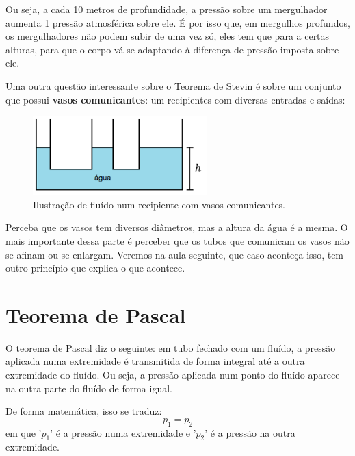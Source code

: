 \documentclass[12pt]{extarticle}
\newcommand{\<}{\langle}
\renewcommand{\>}{\rangle}
\theoremstyle{definition}
\begin{document}
Ou seja, a cada 10 metros de profundidade, a pressão sobre um mergulhador aumenta 1 pressão atmosférica sobre ele. É por isso que, em mergulhos profundos, os mergulhadores não podem subir de uma vez só, eles tem que para a certas alturas, para que o corpo vá se adaptando à diferença de pressão imposta sobre ele.

Uma outra questão interessante sobre o Teorema de Stevin é sobre um conjunto que possui \textbf{vasos comunicantes}: um recipientes com diversas entradas e saídas:
\begin{figure}[H]
    \centering
    \includegraphics[width=0.6\textwidth]{vasos_comunicantes.png}
    \caption{Ilustração de fluído num recipiente com vasos comunicantes.}
    \label{fig:vasos}
\end{figure}

Perceba que os vasos tem diversos diâmetros, mas a altura da água é a mesma. O mais importante dessa parte é perceber que os tubos que comunicam os vasos não se afinam ou se enlargam. Veremos na aula seguinte, que caso aconteça isso, tem outro princípio que explica o que acontece.

\section{Teorema de Pascal}
O teorema de Pascal diz o seguinte: em tubo fechado com um fluído, a pressão aplicada numa extremidade é transmitida de forma integral até a outra extremidade do fluído. Ou seja, a pressão aplicada num ponto do fluído aparece na outra parte do fluído de forma igual.

De forma matemática, isso se traduz:
\begin{equation}
    p_1 = p_2
\end{equation}
\noindent em que '$p_1$' é a pressão numa extremidade e '$p_2$' é a pressão na outra extremidade.
\end{document}

